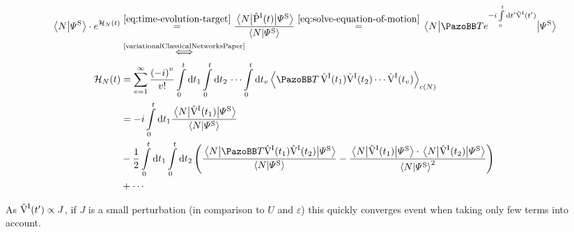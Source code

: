 \begin{equation}
    \label{eq:cumulant-expansion}
    \begin{split}
        \braketHelper{N}{\picturePsi[\schroedingerPicture]{}} \cdot e^{\HNOft} &\stackrel{\ref{eq:time-evolution-target}}{=} \frac{\bracketHelper{N}{\timeEvolutionOperator[\interactionPicture]}{\picturePsi[\schroedingerPicture]{}}}{\braketHelper{N}{\picturePsi[\schroedingerPicture]{}}}
        \stackrel{\ref{eq:solve-equation-of-motion}}{=}
        \bracketHelper{N}{
            \timeOrderingOperator e^{-i\int\limits_0^t \text{d} t' \VhamiltonianOf[\interactionPicture]{t'}}
        }{\picturePsi[\schroedingerPicture]{}}\\
        &\stackrel{\text{\cite{variationalClassicalNetworksPaper}}}{\Longleftrightarrow}\\
        \HNOft &= \sum\limits_{v=1}^\infty \frac{\left(-i\right)^v}{v!} \int\limits_0^t\mathrm{d}t_1 \int\limits_0^t\mathrm{d}t_2 \,\,\dots \int\limits_0^t\mathrm{d}t_v \left\langle \timeOrderingOperator\, \VhamiltonianOf[\interactionPicture]{t_1}\VhamiltonianOf[\interactionPicture]{t_2} \cdots \VhamiltonianOf[\interactionPicture]{t_v} \right\rangle_{\text{c}(N)}\\
        &= -i \int\limits_0^t \mathrm{d}t_1 \frac{\bracketHelper{N}{\VhamiltonianOf[\interactionPicture]{t_1}}{\picturePsi[\schroedingerPicture]{}}}{\braketHelper{N}{\picturePsi[\schroedingerPicture]{}}}\\ 
        &- \frac{1}{2} \int\limits_0^t\mathrm{d}t_1 \int\limits_0^t\mathrm{d}t_2
        \left(
        \frac{\bracketHelper{N}{\timeOrderingOperator
        \VhamiltonianOf[\interactionPicture]{t_1}\VhamiltonianOf[\interactionPicture]{t_2}
        }{\picturePsi[\schroedingerPicture]{}}}{\braketHelper{N}{\picturePsi[\schroedingerPicture]{}}} -  \frac{\bracketHelper{N}{\VhamiltonianOf[\interactionPicture]{t_1}}{\picturePsi[\schroedingerPicture]{}} \cdot \bracketHelper{N}{\VhamiltonianOf[\interactionPicture]{t_2}}{\picturePsi[\schroedingerPicture]{}}}{\braketHelper{N}{\picturePsi[\schroedingerPicture]{}}^2}
        \right)\\
        &+ \cdots
    \end{split}
\end{equation}

As $\VhamiltonianOf[\interactionPicture]{t'} \propto J$, if $J$ is a small perturbation (in comparison to $U$ and $\varepsilon$) this quickly converges event when taking only few terms into account.